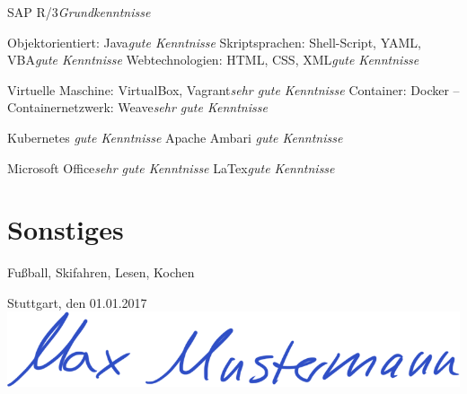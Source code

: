 \documentclass[11pt,a4paper]{moderncv}
\begin{document}
{SAP R/3\hfill {\scriptsize \itshape Grundkenntnisse}}

{Objektorientiert: Java\hfill {\scriptsize \itshape gute Kenntnisse}\newline
Skriptsprachen: Shell-Script, YAML, VBA\hfill {\scriptsize \itshape gute Kenntnisse}\newline
Webtechnologien: HTML, CSS, XML\hfill {\scriptsize \itshape gute Kenntnisse}}

{Virtuelle Maschine: VirtualBox, Vagrant\hfill {\scriptsize \itshape sehr gute Kenntnisse}\newline
Container: Docker  --  Containernetzwerk: Weave\hfill {\scriptsize \itshape sehr gute Kenntnisse}}

{Kubernetes \hfill {\scriptsize \itshape gute Kenntnisse}\newline
Apache Ambari \hfill {\scriptsize \itshape gute Kenntnisse}\newline}

{Microsoft Office\hfill {\scriptsize \itshape sehr gute Kenntnisse}\newline
LaTex\hfill {\scriptsize \itshape gute Kenntnisse}\newline}




\section{Sonstiges} 

{Fußball, Skifahren, Lesen, Kochen}


Stuttgart, den 01.01.2017 ~~~~~~~~~~~ \includegraphics[height=0.035\textheight]{signature.png}
\end{document}
